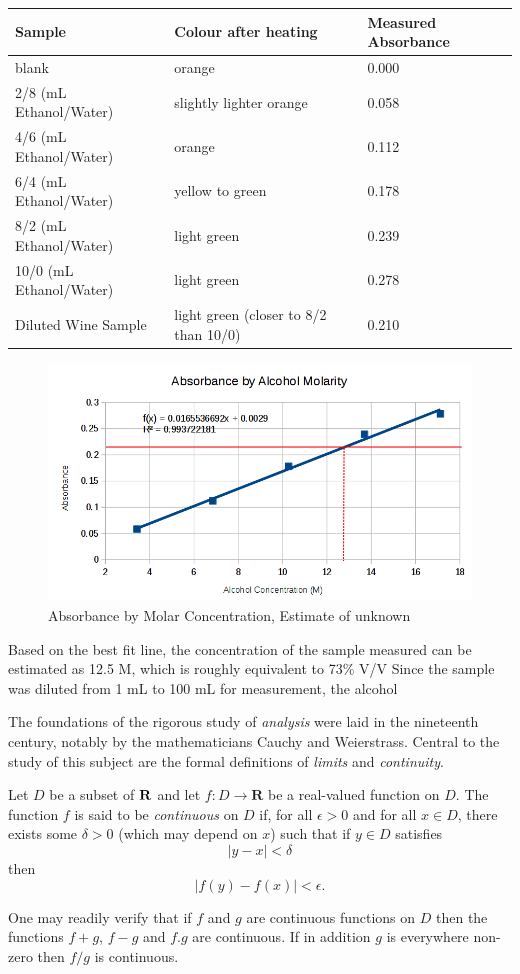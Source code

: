 \documentclass[a4paper,12pt]{article}
\begin{document}
\begin{center}
    \begin{tabular}{| l | l | l |}
    \hline
	Sample & Colour after heating & Measured Absorbance\\ \hline
	blank & orange & 0.000 \\ \hline
	2/8 (mL Ethanol/Water) & slightly lighter orange & 0.058\\ \hline
	4/6 (mL Ethanol/Water) & orange & 0.112\\ \hline
	6/4 (mL Ethanol/Water) & yellow to green & 0.178\\ \hline	
	8/2 (mL Ethanol/Water) & light green & 0.239\\ \hline    
    10/0 (mL Ethanol/Water) & light green & 0.278\\ \hline
    Diluted Wine Sample & light green (closer to 8/2 than 10/0) & 0.210\\ \hline    
    \hline
    \end{tabular}
\end{center}
\newpage
\begin{figure}
  \includegraphics[width=\linewidth]{absorbbyEst.png}
  \caption{Absorbance by Molar Concentration, Estimate of unknown}
  \label{Absorbance by Molar Concentration, Estimate of unknown}
\end{figure}

Based on the best fit line, the concentration of the sample measured can
be estimated as 12.5 M, which is roughly equivalent to 73\% V/V
Since the sample was diluted from 1 mL to 100 mL for
measurement, the alcohol

\newpage
The foundations of the rigorous study of \emph{analysis}
were laid in the nineteenth century, notably by the
mathematicians Cauchy and Weierstrass. Central to the
study of this subject are the formal definitions of
\emph{limits} and \emph{continuity}.

Let $D$ be a subset of $\bf R$ and let
$f \colon D \to \mathbf{R}$ be a real-valued function on
$D$. The function $f$ is said to be \emph{continuous} on
$D$ if, for all $\epsilon > 0$ and for all $x \in D$,
there exists some $\delta > 0$ (which may depend on $x$)
such that if $y \in D$ satisfies
\[ |y - x| < \delta \]
then
\[ |f(y) - f(x)| < \epsilon. \]

One may readily verify that if $f$ and $g$ are continuous
functions on $D$ then the functions $f+g$, $f-g$ and
$f.g$ are continuous. If in addition $g$ is everywhere
non-zero then $f/g$ is continuous.
\end{document}
